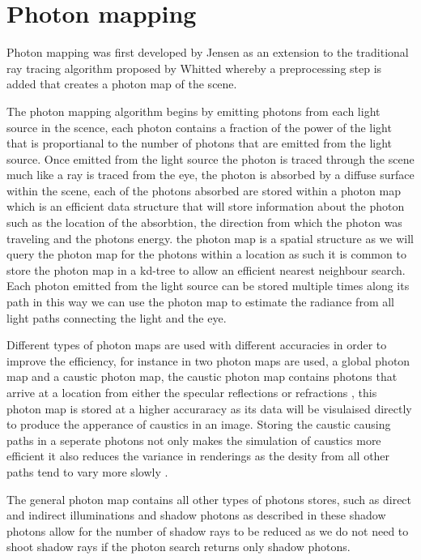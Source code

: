 \section{Photon mapping}
Photon mapping was first developed by Jensen \cite{Jensen95b} as an extension to the traditional ray
tracing algorithm proposed by Whitted \cite{whitted79a} whereby a preprocessing step is added that
creates a photon map of the scene.

The photon mapping algorithm begins by emitting photons from each light source in the scence,
each photon contains a fraction of the power of the light that is proportianal to the number
of photons that are emitted from the light source. Once emitted from the light source the
photon is traced through the scene much like a ray is traced from the eye, 
the photon is absorbed by a diffuse surface within the scene, each of the photons absorbed are stored within a photon map
which is an efficient data structure that will store information about the photon such as the
location of the absorbtion, the direction from which the photon was traveling and the photons
energy. the photon map is a spatial structure as we will query the photon map for the photons
within a location as such it is common to store the photon map in a kd-tree to allow an efficient
nearest neighbour search. Each photon emitted from the light source can be stored multiple times
along its path in this way we can use the photon map to estimate the radiance from all light
paths connecting the light and the eye.

Different types of photon maps are used with different accuracies in order to
improve the efficiency, for instance in \cite{Jensen96a} two photon maps are used, a global photon
map and a caustic photon map, the caustic photon map contains photons that arrive at a location from
either the specular reflections or refractions , this photon map is stored at a higher
accuraracy as its data will be visulaised directly to produce the apperance of caustics in an image.
Storing the caustic causing paths in a seperate photons not only makes the simulation of caustics
more efficient it also reduces the variance in renderings as the desity from all other paths
tend to vary more slowly .

The general photon map contains all other types of photons stores, such as direct and indirect
illuminations and shadow photons as described in \cite{Jensen95c, Jensen96a} these shadow photons
allow for the number of shadow rays to be reduced as we do not need to shoot shadow rays if the
photon search returns only shadow photons.

